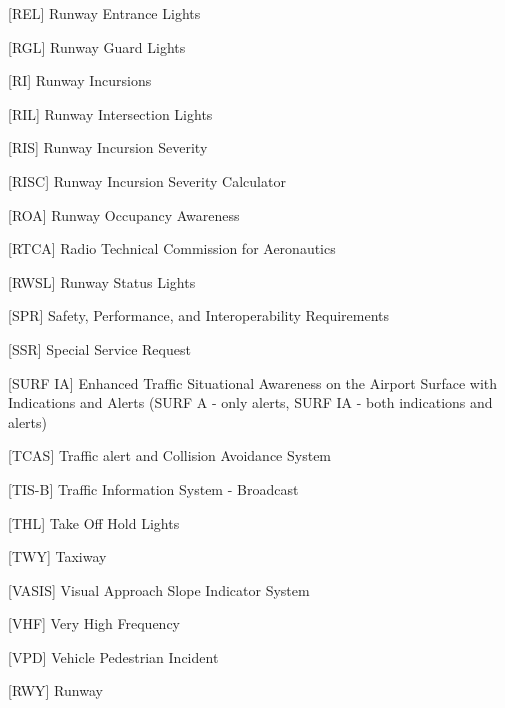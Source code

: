 \begin{acronym}
     [REL] {Runway Entrance Lights}

     [RGL] {Runway Guard Lights}

     [RI] {Runway Incursions}

     [RIL] {Runway Intersection Lights}

     [RIS] {Runway Incursion Severity}

     [RISC] {Runway Incursion Severity Calculator}

     [ROA] {Runway Occupancy Awareness}

     [RTCA] {Radio Technical Commission for Aeronautics}

     [RWSL] {Runway Status Lights}

     [SPR] {Safety, Performance, and Interoperability Requirements}    

     [SSR] {Special Service Request} 

     [SURF IA] {Enhanced Traffic Situational Awareness on the Airport Surface with Indications and Alerts (SURF A - only alerts, SURF IA - both indications and alerts)}
    
     [TCAS] {Traffic alert and Collision Avoidance System}
    
     [TIS-B] {Traffic Information System - Broadcast}

     [THL] {Take Off Hold Lights}
    
     [TWY] {Taxiway}

     [VASIS] {Visual Approach Slope Indicator System}

     [VHF] {Very High Frequency}
    
     [VPD] {Vehicle Pedestrian Incident}
    
     [RWY] {Runway}


    


 

\end{acronym}
